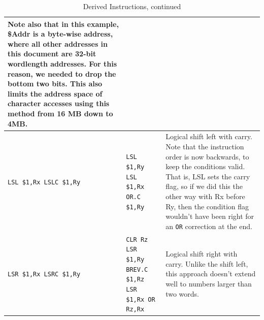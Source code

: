 \documentclass{gqtekspec}
\begin{document}
\begin{table}
\begin{center}
\begin{tabular}{p{1.1in}p{1.8in}p{3in}}
{	Note also that in this example, \$Addr is a byte-wise address, where
	all other addresses in this document are 32-bit wordlength addresses. 
	For this reason,
	we needed to drop the bottom two bits.  This also limits the address
	space of character accesses using this method from 16 MB down to 4MB.}
		\\\hline
\parbox[t]{1.5in}{\tt LSL \$1,Rx\\ LSLC \$1,Ry}
	& \parbox[t]{1.5in}{\tt LSL \$1,Ry \\
	LSL \$1,Rx \\
	OR.C \$1,Ry}
	& Logical shift left with carry.  Note that the
	instruction order is now backwards, to keep the conditions valid.
	That is, LSL sets the carry flag, so if we did this the other way
	with Rx before Ry, then the condition flag wouldn't have been right
	for an {\tt OR} correction at the end. \\\hline
\parbox[t]{1.5in}{\tt LSR \$1,Rx \\ LSRC \$1,Ry}
	& \parbox[t]{1.5in}{\tt CLR Rz \\
	LSR \$1,Ry \\
	BREV.C \$1,Rz \\
	LSR \$1,Rx \\
	OR Rz,Rx}
	& Logical shift right with carry.  Unlike the shift left, this
	approach doesn't extend well to numbers larger than two words. \\\hline
\end{tabular}
\caption{Derived Instructions, continued}\label{tbl:derived-2}
\end{center}\end{table}
\end{document}
